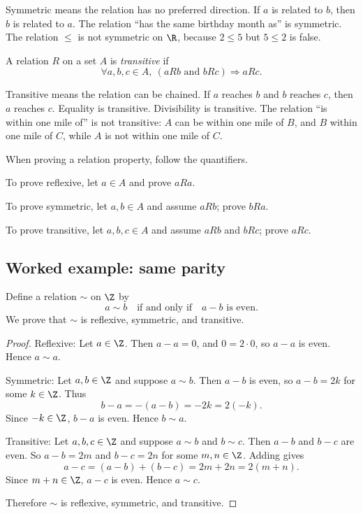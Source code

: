 Symmetric means the relation has no preferred direction. If $a$ is related to $b$, then $b$ is related to $a$. The relation ``has the same birthday month as'' is symmetric. The relation $\leq$ is not symmetric on $\R$, because $2\leq 5$ but $5\leq 2$ is false.

\begin{definition}
A relation $R$ on a set $A$ is \emph{transitive} if
\[
\forall a,b,c\in A,\ (aRb\text{ and }bRc)\Rightarrow aRc.
\]
\end{definition}

Transitive means the relation can be chained. If $a$ reaches $b$ and $b$ reaches $c$, then $a$ reaches $c$. Equality is transitive. Divisibility is transitive. The relation ``is within one mile of'' is not transitive: $A$ can be within one mile of $B$, and $B$ within one mile of $C$, while $A$ is not within one mile of $C$.

\begin{formalbox}
When proving a relation property, follow the quantifiers.

To prove reflexive, let $a\in A$ and prove $aRa$.

To prove symmetric, let $a,b\in A$ and assume $aRb$; prove $bRa$.

To prove transitive, let $a,b,c\in A$ and assume $aRb$ and $bRc$; prove $aRc$.
\end{formalbox}

\subsection{Worked example: same parity}

Define a relation $\sim$ on $\Z$ by
\[
a\sim b\quad\text{if and only if}\quad a-b\text{ is even}.
\]
We prove that $\sim$ is reflexive, symmetric, and transitive.

\begin{proof}
Reflexive: Let $a\in\Z$. Then $a-a=0$, and $0=2\cdot 0$, so $a-a$ is even. Hence $a\sim a$.

Symmetric: Let $a,b\in\Z$ and suppose $a\sim b$. Then $a-b$ is even, so $a-b=2k$ for some $k\in\Z$. Thus
\[
b-a=-(a-b)=-2k=2(-k).
\]
Since $-k\in\Z$, $b-a$ is even. Hence $b\sim a$.

Transitive: Let $a,b,c\in\Z$ and suppose $a\sim b$ and $b\sim c$. Then $a-b$ and $b-c$ are even. So $a-b=2m$ and $b-c=2n$ for some $m,n\in\Z$. Adding gives
\[
a-c=(a-b)+(b-c)=2m+2n=2(m+n).
\]
Since $m+n\in\Z$, $a-c$ is even. Hence $a\sim c$.

Therefore $\sim$ is reflexive, symmetric, and transitive.
\end{proof}

